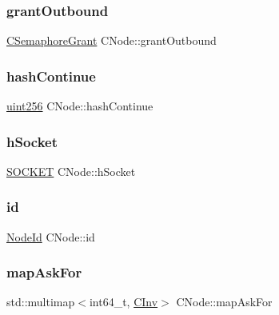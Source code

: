 \subsubsection{\texorpdfstring{grant\+Outbound}{grantOutbound}}
{\footnotesize\ttfamily \mbox{\hyperlink{class_c_semaphore_grant}{C\+Semaphore\+Grant}} C\+Node\+::grant\+Outbound}

\mbox{\label{class_c_node_a1a1c0d94de0197c5c4abf5a8d13364f3}} 
\subsubsection{\texorpdfstring{hash\+Continue}{hashContinue}}
{\footnotesize\ttfamily \mbox{\hyperlink{classuint256}{uint256}} C\+Node\+::hash\+Continue}

\mbox{\label{class_c_node_a7cda6efa6a9ef9db3eebe70fc3bdd45a}} 
\subsubsection{\texorpdfstring{h\+Socket}{hSocket}}
{\footnotesize\ttfamily \mbox{\hyperlink{compat_8h_a26ef1173e2f2c0d3db27eca28397d723}{S\+O\+C\+K\+ET}} C\+Node\+::h\+Socket}

\mbox{\label{class_c_node_af99591c635f495fc1e6c14745a2a4203}} 
\subsubsection{\texorpdfstring{id}{id}}
{\footnotesize\ttfamily \mbox{\hyperlink{net_8h_a954d746a58632565552615fd0a4ee660}{Node\+Id}} C\+Node\+::id}

\mbox{\label{class_c_node_a7593dfbd76c34a81169e3fb2aa0e0cf7}} 
\subsubsection{\texorpdfstring{map\+Ask\+For}{mapAskFor}}
{\footnotesize\ttfamily std\+::multimap$<$int64\+\_\+t, \mbox{\hyperlink{class_c_inv}{C\+Inv}}$>$ C\+Node\+::map\+Ask\+For}

